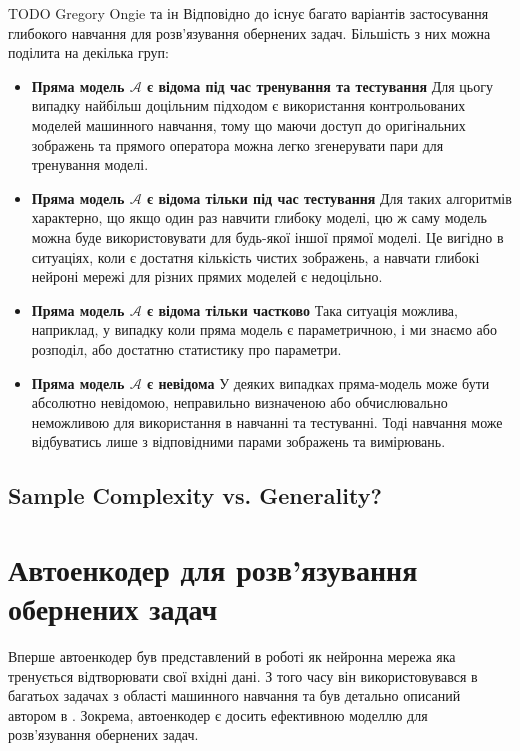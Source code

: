 \documentclass[14pt,a4paper]{extarticle}
\newcounter{e}
\numberwithin{equation}{section}
\numberwithin{figure}{section}
\begin{document}
	TODO Gregory Ongie та ін
	Відповідно до \cite{ongie2020deep} існує багато варіантів застосування глибокого навчання для розв'язування обернених задач. Більшість з них можна поділита на декілька груп:
	\begin{itemize}
		\item \textbf{Пряма модель $\mathcal{A}$ є відома під час тренування та тестування} \newline
		Для цьогу випадку найбільш доцільним підходом є використання контрольованих моделей машинного навчання, тому що маючи доступ до оригінальних зображень та прямого оператора можна легко згенерувати пари для тренування моделі.
				
		\item \textbf{Пряма модель $\mathcal{A}$ є відома тільки під час тестування} \newline
		Для таких алгоритмів характерно, що якщо один раз навчити глибоку моделі, цю ж саму модель можна буде використовувати для будь-якої іншої прямої моделі. Це вигідно в ситуаціях, коли є достатня кількість чистих зображень, а навчати глибокі нейроні мережі для різних прямих моделей є недоцільно.
		

		\item \textbf{Пряма модель $\mathcal{A}$ є відома тільки частково} \newline
		Така ситуація можлива, наприклад, у випадку коли пряма модель є параметричною, і ми знаємо або розподіл, або
		достатню статистику про параметри.

		\item \textbf{Пряма модель $\mathcal{A}$ є невідома} \newline
		У деяких випадках пряма-модель може бути абсолютно невідомою, неправильно визначеною або обчислювально неможливою для використання в навчанні та тестуванні. Тоді навчання може відбуватись лише з відповідними парами зображень та вимірювань. 
	\end{itemize}


	\subsection{Sample Complexity vs. Generality?}

	\newpage
	\thispagestyle{empty}
	\section{Автоенкодер для розв'язування обернених задач}

	Вперше автоенкодер був представлений в роботі \cite{10.5555/104279} як нейронна мережа яка тренується відтворювати свої вхідні дані. З того часу він використовувався в багатьох задачах з області машинного навчання та був детально описаний автором в \cite{Goodfellow-et-al-2016}. Зокрема, автоенкодер є досить ефективною моделлю для розв'язування обернених задач.
	
\end{document}
